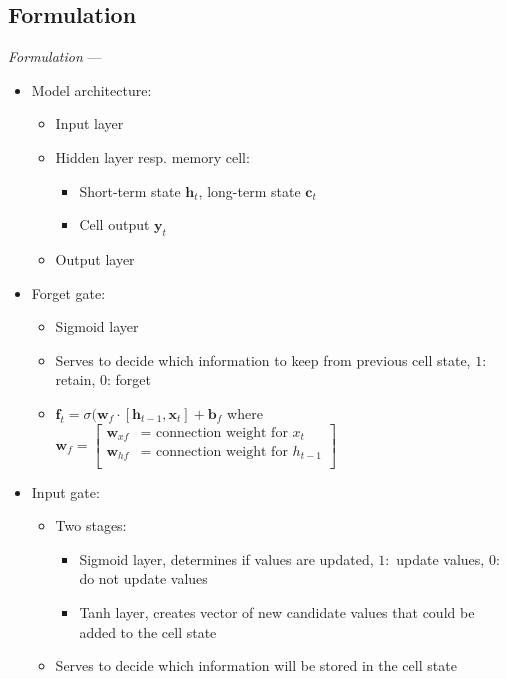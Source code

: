 \subsection*{Formulation}
\emph{Formulation} --- 
\begin{itemize}
    \item Model architecture: 
    \begin{itemize}
        \item Input layer
        \item Hidden layer resp. memory cell: 
        \begin{itemize}
            \item Short-term state $\boldsymbol{h}_t$, long-term state $\boldsymbol{c}_t$
            \item Cell output $\boldsymbol{y}_t$
        \end{itemize}
        \item Output layer
    \end{itemize}
    \item Forget gate:
    \begin{itemize}
        \item Sigmoid layer
        \item Serves to decide which information to keep from previous cell state, $1:$ retain, $0$: forget
        \item $\boldsymbol{f}_t = \sigma (\boldsymbol{w}_f \cdot [ \boldsymbol{h}_{t-1}, \boldsymbol{x}_t ] + \boldsymbol{b}_f $ where $\boldsymbol{w}_f = \begin{bmatrix}
        \boldsymbol{w}_{xf} & \textrm{= connection weight for } x_t \\
        \boldsymbol{w}_{hf} & \textrm{= connection weight for } h_{t-1} \\
        \end{bmatrix}$
    \end{itemize}
    \item Input gate:
    \begin{itemize}
        \item Two stages:
        \begin{itemize}
            \item Sigmoid layer, determines if values are updated, $1:$ update values, $0$: do not update values
            \item Tanh layer, creates vector of new candidate values that could be added to the cell state
        \end{itemize}
        \item Serves to decide which information will be stored in the cell state

\end{itemize}
\end{itemize}

